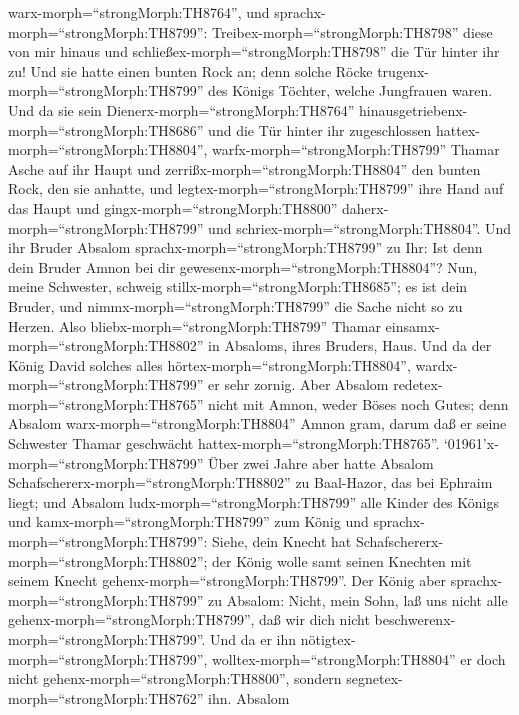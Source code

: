 warx-morph=``strongMorph:TH8764'', und
sprachx-morph=``strongMorph:TH8799'':
Treibex-morph=``strongMorph:TH8798'' diese von mir hinaus und
schließex-morph=``strongMorph:TH8798'' die Tür hinter ihr zu!
 Und sie hatte einen bunten Rock an; denn solche Röcke
trugenx-morph=``strongMorph:TH8799'' des Königs Töchter, welche
Jungfrauen waren. Und da sie sein Dienerx-morph=``strongMorph:TH8764''
hinausgetriebenx-morph=``strongMorph:TH8686'' und die Tür hinter ihr
zugeschlossen hattex-morph=``strongMorph:TH8804'', 
warfx-morph=``strongMorph:TH8799'' Thamar Asche auf ihr Haupt und
zerrißx-morph=``strongMorph:TH8804'' den bunten Rock, den sie anhatte,
und legtex-morph=``strongMorph:TH8799'' ihre Hand auf das Haupt und
gingx-morph=``strongMorph:TH8800'' daherx-morph=``strongMorph:TH8799''
und schriex-morph=``strongMorph:TH8804''.  Und ihr Bruder
Absalom sprachx-morph=``strongMorph:TH8799'' zu Ihr: Ist denn dein
Bruder Amnon bei dir gewesenx-morph=``strongMorph:TH8804''? Nun, meine
Schwester, schweig stillx-morph=``strongMorph:TH8685''; es ist dein
Bruder, und nimmx-morph=``strongMorph:TH8799'' die Sache nicht so zu
Herzen. Also bliebx-morph=``strongMorph:TH8799'' Thamar
einsamx-morph=``strongMorph:TH8802'' in Absaloms, ihres Bruders, Haus.
 Und da der König David solches alles
hörtex-morph=``strongMorph:TH8804'', wardx-morph=``strongMorph:TH8799''
er sehr zornig. Aber Absalom redetex-morph=``strongMorph:TH8765'' nicht
mit Amnon, weder Böses noch Gutes;  denn Absalom
warx-morph=``strongMorph:TH8804'' Amnon gram, darum daß er seine
Schwester Thamar geschwächt hattex-morph=``strongMorph:TH8765''.
 `01961'\textbar x-morph=``strongMorph:TH8799'' Über zwei
Jahre aber hatte Absalom Schafschererx-morph=``strongMorph:TH8802'' zu
Baal-Hazor, das bei Ephraim liegt; und Absalom
ludx-morph=``strongMorph:TH8799'' alle Kinder des Königs 
und kamx-morph=``strongMorph:TH8799'' zum König und
sprachx-morph=``strongMorph:TH8799'': Siehe, dein Knecht hat
Schafschererx-morph=``strongMorph:TH8802''; der König wolle samt seinen
Knechten mit seinem Knecht gehenx-morph=``strongMorph:TH8799''.
 Der König aber sprachx-morph=``strongMorph:TH8799'' zu
Absalom: Nicht, mein Sohn, laß uns nicht alle
gehenx-morph=``strongMorph:TH8799'', daß wir dich nicht
beschwerenx-morph=``strongMorph:TH8799''. Und da er ihn
nötigtex-morph=``strongMorph:TH8799'',
wolltex-morph=``strongMorph:TH8804'' er doch nicht
gehenx-morph=``strongMorph:TH8800'', sondern
segnetex-morph=``strongMorph:TH8762'' ihn.  Absalom
